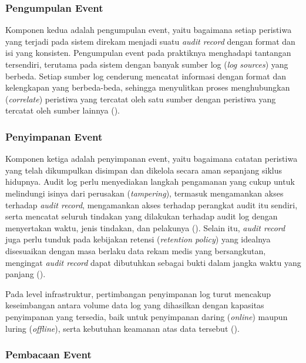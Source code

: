 \subsubsection{Pengumpulan Event}
\label{subsubsec:pengumpulan-event}

Komponen kedua adalah pengumpulan event, yaitu bagaimana setiap
peristiwa yang terjadi pada sistem direkam menjadi suatu
\textit{audit record} dengan format dan isi yang konsisten.
Pengumpulan event pada praktiknya menghadapi tantangan tersendiri,
terutama pada sistem dengan banyak sumber log (\textit{log sources})
yang berbeda. Setiap sumber log cenderung mencatat informasi dengan
format dan kelengkapan yang berbeda-beda, sehingga menyulitkan proses
menghubungkan (\textit{correlate}) peristiwa yang tercatat oleh satu
sumber dengan peristiwa yang tercatat oleh sumber lainnya
(\cite{nist80092}).

\subsubsection{Penyimpanan Event}
\label{subsubsec:penyimpanan-event}

Komponen ketiga adalah penyimpanan event, yaitu bagaimana catatan
peristiwa yang telah dikumpulkan disimpan dan dikelola secara aman
sepanjang siklus hidupnya. Audit log perlu menyediakan langkah
pengamanan yang cukup untuk melindungi isinya dari perusakan
(\textit{tampering}), termasuk mengamankan akses terhadap
\textit{audit record}, mengamankan akses terhadap perangkat audit itu
sendiri, serta mencatat seluruh tindakan yang dilakukan terhadap audit
log dengan menyertakan waktu, jenis tindakan, dan pelakunya
(\cite{iso27789_2021}). Selain itu, \textit{audit record} juga perlu
tunduk pada kebijakan retensi (\textit{retention policy}) yang
idealnya disesuaikan dengan masa berlaku data rekam medis yang
bersangkutan, mengingat \textit{audit record} dapat dibutuhkan sebagai
bukti dalam jangka waktu yang panjang (\cite{iso27789_2021}).

Pada level infrastruktur, pertimbangan penyimpanan log turut mencakup
keseimbangan antara volume data log yang dihasilkan dengan kapasitas
penyimpanan yang tersedia, baik untuk penyimpanan daring
(\textit{online}) maupun luring (\textit{offline}), serta kebutuhan
keamanan atas data tersebut (\cite{nist80092}).

\subsubsection{Pembacaan Event}
\label{subsubsec:pembacaan-event}


